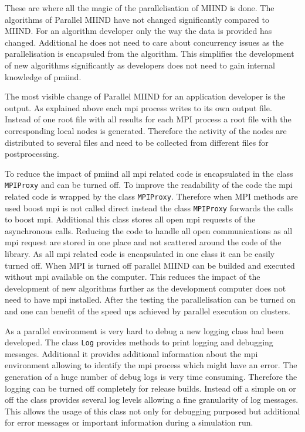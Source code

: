 \documentclass[12pt]{article}
\begin{document}
These are where all the magic of the parallelisation of MIIND is done. 
The algorithms of Parallel MIIND have not changed significantly compared to MIIND. 
For an algorithm developer only the way the data is provided has changed.
Additional he does not need to care about concurrency issues as the parallelisation is encapsuled from the algorithm.
This simplifies the development of new algorithms significantly as developers does not need to gain internal knowledge of pmiind.

The most visible change of Parallel MIIND for an application developer is the output.
As explained above each mpi process writes to its own output file.
Instead of one root file with all results for each MPI process a root file with the corresponding local nodes is generated.
Therefore the activity of the nodes are distributed to several files and need to be collected from different files for postprocessing.

To reduce the impact of pmiind all mpi related code is encapsulated in the class \texttt{MPIProxy} and can be turned off.
To improve the readability of the code the mpi related code is wrapped by the class \texttt{MPIProxy}.
Therefore when MPI methods are used boost mpi is not called direct instead the class \texttt{MPIProxy} forwards the calls to boost mpi.
Additional this class stores all open mpi requests of the asynchronous calls.
Reducing the code to handle all open communications as all mpi request are stored in one place and not scattered around the code of the library.
As all mpi related code is encapsulated in one class it can be easily turned off.
When MPI is turned off parallel MIIND can be builded and executed without mpi available on the computer.
This reduces the impact of the development of new algorithms further as the development computer does not need to have mpi installed.
After the testing the parallelisation can be turned on and one can benefit of the speed ups achieved by parallel execution on clusters.

As a parallel environment is very hard to debug a new logging class had been developed.
The class \texttt{Log} provides methods to print logging and debugging messages.
Additional it provides additional information about the mpi environment allowing to identify the mpi process which might have an error.
The generation of a huge number of debug logs is very time consuming. Therefore the logging can be turned off completely for release builds.
Instead off a simple on or off the class provides several log levels allowing a fine granularity of log messages.
This allows the usage of this class not only for debugging purposed but additional for error messages or important information during a simulation run.
\end{document}
